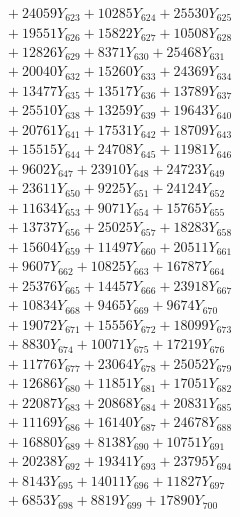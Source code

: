 \documentclass[a4paper,10pt]{article}
\begin{document}
{\begin{align}
&\;  + 24059 Y_{623} + 10285 Y_{624} + 25530 Y_{625} \\[0.3ex]
&\;  + 19551 Y_{626} + 15822 Y_{627} + 10508 Y_{628} \\[0.5ex]\allowbreak
&\;  + 12826 Y_{629} + 8371 Y_{630} + 25468 Y_{631} \\[0.3ex]
&\;  + 20040 Y_{632} + 15260 Y_{633} + 24369 Y_{634} \\[0.3ex]
&\;  + 13477 Y_{635} + 13517 Y_{636} + 13789 Y_{637} \\[0.3ex]
&\;  + 25510 Y_{638} + 13259 Y_{639} + 19643 Y_{640} \\[0.3ex]
&\;  + 20761 Y_{641} + 17531 Y_{642} + 18709 Y_{643} \\[0.3ex]
&\;  + 15515 Y_{644} + 24708 Y_{645} + 11981 Y_{646} \\[0.3ex]
&\;  + 9602 Y_{647} + 23910 Y_{648} + 24723 Y_{649} \\[0.3ex]
&\;  + 23611 Y_{650} + 9225 Y_{651} + 24124 Y_{652} \\[0.3ex]
&\;  + 11634 Y_{653} + 9071 Y_{654} + 15765 Y_{655} \\[0.3ex]
&\;  + 13737 Y_{656} + 25025 Y_{657} + 18283 Y_{658} \\[0.5ex]\allowbreak
&\;  + 15604 Y_{659} + 11497 Y_{660} + 20511 Y_{661} \\[0.3ex]
&\;  + 9607 Y_{662} + 10825 Y_{663} + 16787 Y_{664} \\[0.3ex]
&\;  + 25376 Y_{665} + 14457 Y_{666} + 23918 Y_{667} \\[0.3ex]
&\;  + 10834 Y_{668} + 9465 Y_{669} + 9674 Y_{670} \\[0.3ex]
&\;  + 19072 Y_{671} + 15556 Y_{672} + 18099 Y_{673} \\[0.3ex]
&\;  + 8830 Y_{674} + 10071 Y_{675} + 17219 Y_{676} \\[0.3ex]
&\;  + 11776 Y_{677} + 23064 Y_{678} + 25052 Y_{679} \\[0.3ex]
&\;  + 12686 Y_{680} + 11851 Y_{681} + 17051 Y_{682} \\[0.3ex]
&\;  + 22087 Y_{683} + 20868 Y_{684} + 20831 Y_{685} \\[0.3ex]
&\;  + 11169 Y_{686} + 16140 Y_{687} + 24678 Y_{688} \\[0.5ex]\allowbreak
&\;  + 16880 Y_{689} + 8138 Y_{690} + 10751 Y_{691} \\[0.3ex]
&\;  + 20238 Y_{692} + 19341 Y_{693} + 23795 Y_{694} \\[0.3ex]
&\;  + 8143 Y_{695} + 14011 Y_{696} + 11827 Y_{697} \\[0.3ex]
&\;  + 6853 Y_{698} + 8819 Y_{699} + 17890 Y_{700} \\[0.3ex]

\end{align}}
\end{document}
